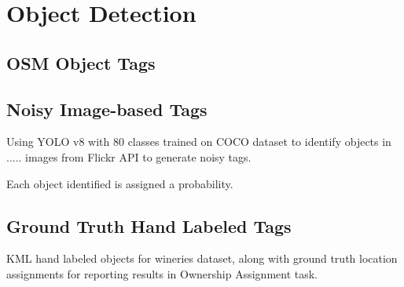 \section{Object Detection}
\label{section:object}

\subsection{OSM Object Tags}

\subsection{Noisy Image-based Tags}
Using YOLO v8 with 80 classes trained on COCO dataset to identify objects in ..... images from Flickr API to generate noisy tags. 

Each object identified is assigned a probability.

\subsection{Ground Truth Hand Labeled Tags}
KML hand labeled objects for wineries dataset, along with ground truth location assignments for reporting results in Ownership Assignment task.
